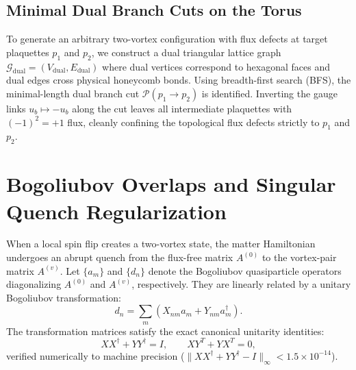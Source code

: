 \subsection{Minimal Dual Branch Cuts on the Torus}
To generate an arbitrary two-vortex configuration with flux defects at target plaquettes $p_1$ and $p_2$, we construct a dual triangular lattice graph $\mathcal{G}_{\mathrm{dual}} = (V_{\mathrm{dual}}, E_{\mathrm{dual}})$ where dual vertices correspond to hexagonal faces and dual edges cross physical honeycomb bonds. Using breadth-first search (BFS), the minimal-length dual branch cut $\mathcal{P}(p_1 \to p_2)$ is identified. Inverting the gauge links $u_b \mapsto -u_b$ along the cut leaves all intermediate plaquettes with $(-1)^2 = +1$ flux, cleanly confining the topological flux defects strictly to $p_1$ and $p_2$.

\section{Bogoliubov Overlaps and Singular Quench Regularization}
\label{sec:p3_bogoliubov_and_thouless}

When a local spin flip creates a two-vortex state, the matter Hamiltonian undergoes an abrupt quench from the flux-free matrix $A^{(0)}$ to the vortex-pair matrix $A^{(v)}$. Let $\{a_m\}$ and $\{d_n\}$ denote the Bogoliubov quasiparticle operators diagonalizing $A^{(0)}$ and $A^{(v)}$, respectively. They are linearly related by a unitary Bogoliubov transformation:
\begin{equation}
\label{eq:p3_bogoliubov_transformation}
d_n = \sum_m \left( X_{nm} a_m + Y_{nm} a_m^\dagger \right).
\end{equation}
The transformation matrices satisfy the exact canonical unitarity identities:
\begin{equation}
X X^\dagger + Y Y^\dagger = I, \qquad X Y^T + Y X^T = 0,
\end{equation}
verified numerically to machine precision ($\|X X^\dagger + Y Y^\dagger - I\|_\infty < 1.5 \times 10^{-14}$).

